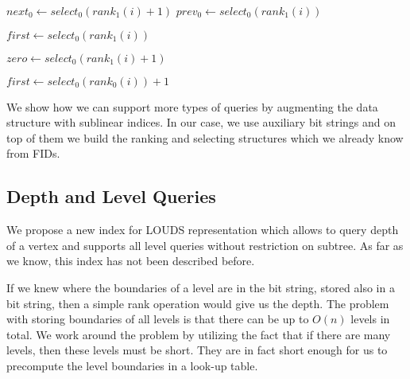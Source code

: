 \begin{algorithmic}
	\State $next_0 \gets select_0(rank_1(i) + 1)$ 
	\State $prev_0 \gets select_0(rank_1(i))$ 
	\State {}
\EndFunction
\end{algorithmic}

\begin{algorithmic}
		\State {}
		\State {}
	\Else
		\State $first \gets select_0(rank_1(i))$ 
		\State {}
	\EndIf
\EndFunction
\end{algorithmic}

\begin{algorithmic}
 
		\State {}
	\Else
		\State $zero \gets select_0(rank_1(i) + 1)$ 
		\State {}
	\EndIf
\EndFunction
\end{algorithmic}

\begin{algorithmic}
		\State {}
	\Else
		\State $first \gets select_0(rank_0(i)) + 1$ 
		\State {}
	\EndIf
\EndFunction
\end{algorithmic}

\bigskip

We show how we can support more types of queries by augmenting the data structure with sublinear indices.
In our case, we use auxiliary bit strings and on top of them we build the ranking and selecting structures which we already know from FIDs.

\subsection{Depth and Level Queries}

We propose a new index for LOUDS representation which allows to query depth of a vertex and supports all level queries without restriction on subtree.
As far as we know, this index has not been described before.

If we knew where the boundaries of a level are in the bit string, stored also in a bit string, then a simple rank operation would give us the depth.
The problem with storing boundaries of all levels is that there can be up to $O(n)$ levels in total.
We work around the problem by utilizing the fact that if there are many levels, then these levels must be short.
They are in fact short enough for us to precompute the level boundaries in a look-up table.

